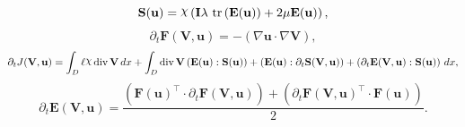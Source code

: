 \documentclass[preview]{standalone}
\let\oldcdot\cdot
\let\cdot\oldcdot
\begin{document}
\begin{dmath*}
\mathbf S({\mathbf{ u }}) = \raisebox{\depth}{$\chi$} \left(\mathbf{I} \lambda  \,\operatorname{tr}\left(\mathbf E({\mathbf{ u }})\right)  + 2 \mu \mathbf E({\mathbf{ u }})\right),
 \end{dmath*}
\begin{dmath*}
\partial_{t} \mathbf F({\mathbf V},{\mathbf{ u }}) = - \left(  \nabla {\mathbf{ u }}  \cdot  \nabla {\mathbf V}  \right),
 \end{dmath*}
\begin{dmath*}
\partial_{t} J({\mathbf V},{\mathbf{ u }}) =  \int_{D} \ell \raisebox{\depth}{$\chi$} \operatorname{div} {\mathbf V} \,dx +  \int_{D} \operatorname{div} {\mathbf V} \left( \mathbf E({\mathbf{ u }}) \mathrel{:} \mathbf S({\mathbf{ u }}) \right) + \left( \mathbf E({\mathbf{ u }}) \mathrel{:} \partial_{t} \mathbf S({\mathbf V},{\mathbf{ u }}) \right) + \left( \partial_{t} \mathbf E({\mathbf V},{\mathbf{ u }}) \mathrel{:} \mathbf S({\mathbf{ u }}) \right) \,dx,
 \end{dmath*}
\begin{dmath*}
\partial_{t} \mathbf E({\mathbf V},{\mathbf{ u }}) = \frac{\left(  \mathbf F({\mathbf{ u }})^\top  \cdot \partial_{t} \mathbf F({\mathbf V},{\mathbf{ u }}) \right) + \left(  \partial_{t} \mathbf F({\mathbf V},{\mathbf{ u }})^\top  \cdot \mathbf F({\mathbf{ u }}) \right)}{2}.
 \end{dmath*}
\end{document}
